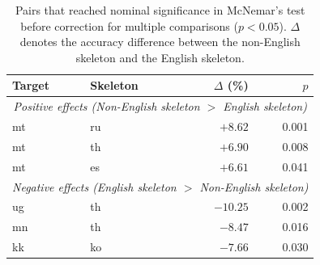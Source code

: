 \begin{table}[!h]
\centering
\small
\begin{tabular}{llrr}
\toprule
Target & Skeleton & $\Delta$ (\%) & $p$ \\
\midrule
\multicolumn{4}{c}{\textit{Positive effects (Non-English skeleton $>$ English skeleton)}} \\
mt & ru & $+8.62$ & 0.001 \\
mt & th & $+6.90$ & 0.008 \\
mt & es & $+6.61$ & 0.041 \\
\midrule
\multicolumn{4}{c}{\textit{Negative effects (English skeleton $>$ Non-English skeleton)}} \\
ug & th & $-10.25$ & 0.002 \\
mn & th & $-8.47$ & 0.016 \\
kk & ko & $-7.66$ & 0.030 \\
\bottomrule
\end{tabular}
\caption{Pairs that reached nominal significance in McNemar's test before correction for multiple comparisons ($p<0.05$). $\Delta$ denotes the accuracy difference between the non-English skeleton and the English skeleton.}
\label{tab:mcnemar}
\end{table}